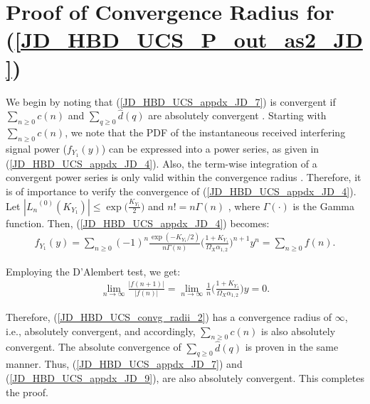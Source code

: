 \section{Proof of Convergence Radius for (\ref{JD_HBD_UCS_P_out_as2_JD})} \label{JD_HBD_UCS_JD_convg_proof}

We begin by noting that (\ref{JD_HBD_UCS_appdx_JD_7}) is convergent if $\sum_{n \geq 0} c(n)$ and $\sum_{q \geq 0} \widehat{d}(q)$ are absolutely convergent \cite{andras2011generalized,amann2005analysis}. Starting with $\sum_{n \geq 0} c(n)$, we note that the PDF of the instantaneous received interfering signal power ($f_{Y_1}(y)$) can be expressed into a power series, as given in (\ref{JD_HBD_UCS_appdx_JD_4}). Also, the term-wise integration of a convergent power series is only valid within the convergence radius \cite{gradshteyn2014table}. Therefore, it is of importance to verify the convergence of (\ref{JD_HBD_UCS_appdx_JD_4}). Let $|{L_n}^{(0)}(K_{Y_{1}})| \leq \exp\bigg(\frac{K_{Y_{1}}}{2}\bigg)$ \cite{andras2011generalized} and $n! = n\Gamma(n)$ \cite{gradshteyn2014table,rached2017unified}, where $\Gamma(\cdot)$ is the Gamma function. Then, (\ref{JD_HBD_UCS_appdx_JD_4}) becomes:
\begin{eqnarray}
	f_{Y_{1}}(y) = \sum_{n\geq0} (-1)^n \frac{\exp(-K_{Y_{1}}/2)}{n\Gamma(n)} \bigg(\frac{1+K_{Y_{1}}}{\Omega_X\alpha_{1,2}}\bigg)^{n+1} y^n = \sum_{n\geq0} f(n). \label{JD_HBD_UCS_convg_radii_2}
	\end{eqnarray}

Employing the D'Alembert test, we get:
\begin{eqnarray}
\lim_{n\to\infty}	\frac{|f(n+1)|}{|f(n)|} = \lim_{n\to\infty} \frac{1}{n} \bigg(\frac{1+K_{Y_{1}}}{\Omega_X\alpha_{1,2}}\bigg) y = 0. \label{JD_HBD_UCS_convg_radii_3}
\end{eqnarray}

Therefore, (\ref{JD_HBD_UCS_convg_radii_2}) has a convergence radius of $\infty$, i.e., absolutely convergent, and accordingly, $\sum_{n \geq 0} c(n)$ is also absolutely convergent. The absolute convergence of $\sum_{q \geq 0} \widehat{d}(q)$ is proven in the same manner. Thus, (\ref{JD_HBD_UCS_appdx_JD_7}) and (\ref{JD_HBD_UCS_appdx_JD_9}), are also absolutely convergent. This completes the proof.
